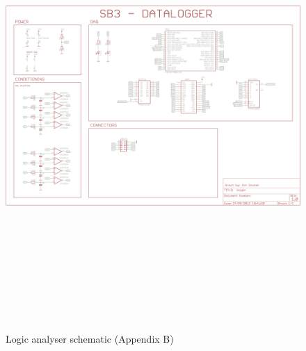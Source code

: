 \documentclass[11pt]{article}
\begin{document}
    \begin{figure}
    \centering
    \includegraphics[height=17cm,angle=90]{../../hardware/schematic.png}
    \caption{Logic analyser schematic (Appendix B)}
    \label{fig:sch}
    \end{figure}
\end{document}
